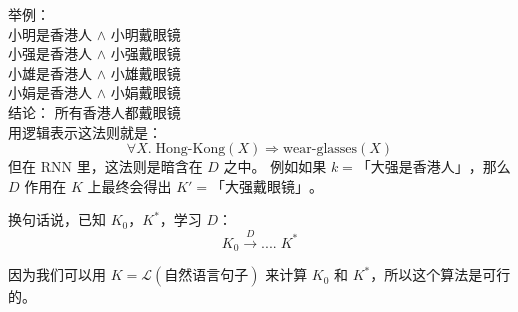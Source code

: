\documentclass[12pt]{article}
\newcommand{\tab}{\hspace*{1cm}}
\begin{document}
举例：\\
\tab 小明是香港人 $\wedge$ 小明戴眼镜 \\
\tab 小强是香港人 $\wedge$ 小强戴眼镜 \\
\tab 小雄是香港人 $\wedge$ 小雄戴眼镜 \\
\tab 小娟是香港人 $\wedge$ 小娟戴眼镜 \\
\tab 结论： 所有香港人都戴眼镜 \\
用逻辑表示这法则就是：
$$ \forall X. \; \mbox{Hong-Kong}(X) \Rightarrow \mbox{wear-glasses}(X) $$
但在 RNN 里，这法则是暗含在 $D$ 之中。 例如如果 $k = \mbox{「大强是香港人」}$，那么 $D$ 作用在 $K$ 上最终会得出 $K' = \mbox{「大强戴眼镜」}$。

换句话说，已知 $K_0$，$K^*$，学习 $D$：
$$ K_0 \stackrel{D}{\longrightarrow} .... \; K^* $$

因为我们可以用 $K = \mathcal{L}(\mbox{自然语言句子})$ 来计算 $K_0$ 和 $K^*$，所以这个算法是可行的。
\end{document}
